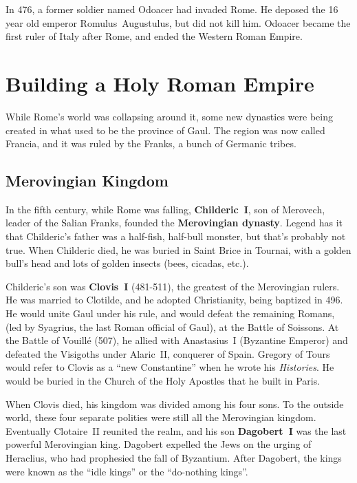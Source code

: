 In 476, a former soldier named Odoacer had invaded Rome.
He deposed the 16 year old emperor Romulus~Augustulus, but did not kill him.
Odoacer became the first ruler of Italy after Rome, and ended the Western Roman Empire.

\section{Building a Holy Roman Empire}

While Rome's world was collapsing around it, some new dynasties were being created
in what used to be the province of Gaul.
The region was now called Francia, and it was ruled by the Franks, a bunch of Germanic tribes.

\subsection*{Merovingian Kingdom}

In the fifth century, while Rome was falling,
\textbf{Childeric~I}, son of Merovech, leader of the Salian Franks, founded the \textbf{Merovingian dynasty}.
Legend has it that Childeric's father was a half-fish, half-bull monster, but that's probably not true.
When Childeric died, he was buried in Saint Brice in Tournai,
with a golden bull's head and lots of golden insects (bees, cicadas, etc.).

Childeric's son was \textbf{Clovis~I} (481-511), the greatest of the Merovingian rulers.
He was married to Clotilde, and he adopted Christianity, being baptized in 496.
He would unite Gaul under his rule, and would defeat the remaining Romans,
(led by Syagrius, the last Roman official of Gaul), at the Battle of Soissons.
At the Battle of Vouill\'e (507), he allied with Anastasius~I (Byzantine Emperor)
and defeated the Visigoths under Alaric~II, conquerer of Spain.
Gregory of Tours would refer to Clovis as a ``new Constantine'' when he wrote his \textit{Histories}.
He would be buried in the Church of the Holy Apostles that he built in Paris.

When Clovis died, his kingdom was divided among his four sons.
To the outside world, these four separate polities were still all the Merovingian kingdom.
Eventually Clotaire~II reunited the realm, and his son \textbf{Dagobert~I} was the last powerful Merovingian king.
Dagobert expelled the Jews on the urging of Heraclius, who had prophesied the fall of Byzantium.
After Dagobert, the kings were known as the ``idle kings'' or the ``do-nothing kings''.

